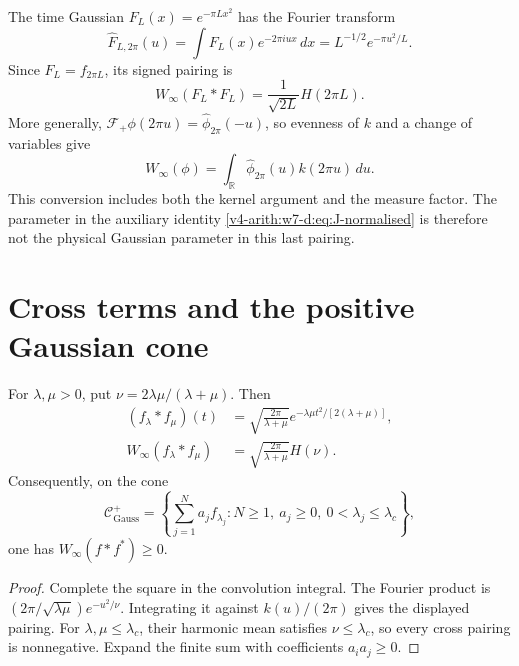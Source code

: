 The time Gaussian \(F_L(x)=e^{-\pi Lx^2}\) has the Fourier transform
\begin{equation}
 \widehat F_{L,2\pi}(u)=\int F_L(x)e^{-2\pi iux}\,dx
       =L^{-1/2}e^{-\pi u^2/L}.
 \label{v4-arith:w7-d:eq:gaussian-FT}
\end{equation}
Since \(F_L=f_{2\pi L}\), its signed pairing is
\[
 W_\infty(F_L*F_L)=\frac1{\sqrt{2L}}H(2\pi L).
\]
More generally, \(\mathcal F_+\phi(2\pi u)=\widehat\phi_{2\pi}(-u)\),
so evenness of \(k\) and a change of variables give
\[
 W_\infty(\phi)=\int_{\mathbb R}\widehat\phi_{2\pi}(u)k(2\pi u)\,du.
\]
This conversion includes both the kernel argument and the measure factor.
The parameter in the auxiliary identity
\eqref{v4-arith:w7-d:eq:J-normalised} is therefore not the physical
Gaussian parameter in this last pairing.

\section{Cross terms and the positive Gaussian cone}
\begin{proposition}
\label{v4-arith:w7-d:thm:positive-cone}
For \(\lambda,\mu>0\), put \(\nu=2\lambda\mu/(\lambda+\mu)\).
Then
\begin{align*}
 (f_\lambda*f_\mu)(t)
 &=\sqrt{\frac{2\pi}{\lambda+\mu}}
           e^{-\lambda\mu t^2/[2(\lambda+\mu)]},\\
 W_\infty(f_\lambda*f_\mu)
 &=\sqrt{\frac{2\pi}{\lambda+\mu}}H(\nu).
\end{align*}
Consequently, on the cone
\begin{equation}
 \mathcal C^+_{\mathrm{Gauss}}=
 \left\{\sum_{j=1}^N a_jf_{\lambda_j}:
 N\ge1,\ a_j\ge0,\ 0<\lambda_j\le\lambda_c\right\},
 \label{v4-arith:w7-d:eq:positive-cone}
\end{equation}
one has \(W_\infty(f*f^*)\ge0\).
\end{proposition}
\begin{proof}
Complete the square in the convolution integral.
The Fourier product is
\((2\pi/\sqrt{\lambda\mu})e^{-u^2/\nu}\).
Integrating it against \(k(u)/(2\pi)\) gives the displayed pairing.
For \(\lambda,\mu\le\lambda_c\), their harmonic mean satisfies
\(\nu\le\lambda_c\), so every cross pairing is nonnegative.
Expand the finite sum with coefficients \(a_i a_j\ge0\).
\end{proof}

